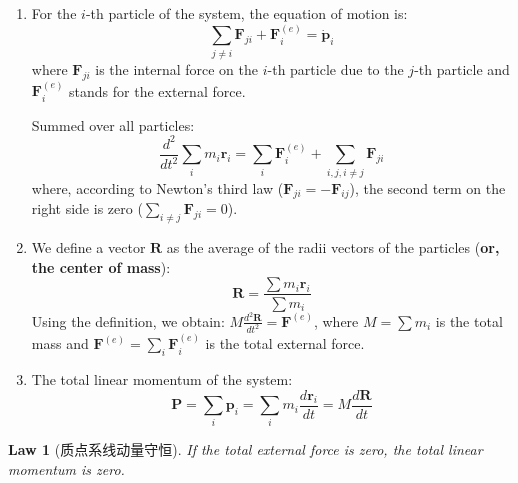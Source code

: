 \documentclass[12pt,a4paper]{article}
\newtheorem{law}{Law}[section]
\theoremstyle{definition}
\theoremstyle{remark}
\renewcommand{\vec}[1]{\mathbf{#1}}
\begin{document}
	\begin{enumerate}
		\item For the $i$-th particle of the system, the equation of motion is:
		\begin{equation*}
			\sum_{j \neq i} \vec{F}_{ji} + \vec{F}_i^{(e)} = \dot{\vec{p}}_i
		\end{equation*}
		where $\vec{F}_{ji}$ is the internal force on the $i$-th particle due to the $j$-th particle and $\vec{F}_i^{(e)}$ stands for the external force.
		
		Summed over all particles:
		\begin{equation*}
			\frac{d^2}{dt^2}\sum_i m_i \vec{r}_i = \sum_i \vec{F}_i^{(e)} + \sum_{i, j, i \neq j} \vec{F}_{ji}
		\end{equation*}
		where, according to Newton's third law ($\vec{F}_{ji} = -\vec{F}_{ij}$), the second term on the right side is zero ($\sum_{i \neq j} \vec{F}_{ji} = 0$).
		
		\item We define a vector $\vec{R}$ as the average of the radii vectors of the particles (\textbf{or, the center of mass}):
		\begin{equation*}
			\vec{R} = \frac{\sum m_i \vec{r}_i}{\sum m_i}
		\end{equation*}
		Using the definition, we obtain: $M\frac{d^2\vec{R}}{dt^2} = \vec{F}^{(e)}$, where $M = \sum m_i$ is the total mass and $\vec{F}^{(e)} = \sum_i \vec{F}_i^{(e)}$ is the total external force.
		
		\item The total linear momentum of the system:
		\begin{equation*}
			\vec{P} = \sum_i \vec{p}_i = \sum_i m_i \frac{d\vec{r}_i}{dt} = M\frac{d\vec{R}}{dt}
		\end{equation*}
	\end{enumerate}
	
	\begin{law}[质点系线动量守恒]
		If the total external force is zero, the total linear momentum is zero.
	\end{law}
	
\end{document}
